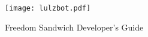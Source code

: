 %
%
%
%
%

\date {}
\thispagestyle{empty}
\begin{center}
\par
\texttt{[image: lulzbot.pdf]}

{\fontsize{25pt}{5cm}\selectfont \textcolor{ao-purple}{Freedom Sandwich Developer's Guide}}

\end{center}
